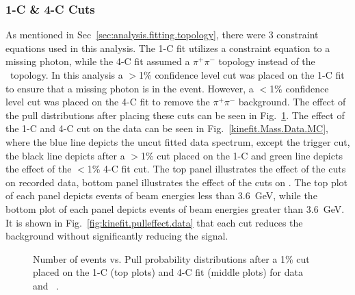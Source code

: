 \subsubsection{1-C \& 4-C Cuts}
As mentioned in Sec~\ref{sec:analysis.fitting.topology}, there were 3 constraint equations used in this analysis. The 1-C fit utilizes a constraint equation to a missing photon, while the 4-C fit assumed a $\pi^+\pi^-$ topology instead of the \epemT \ topology. In this analysis a $>$1\% confidence level cut was placed on the 1-C fit to ensure that a missing photon is in the event. However, a $<$1\% confidence level cut was placed on the 4-C fit to remove the $\pi^+\pi^-$ background. The effect of the pull distributions after placing these cuts can be seen in Fig.~\ref{fig:kinefit.pull.Data.MC}. The effect of the 1-C and 4-C cut on the data can be seen in Fig.~\ref{kinefit.Mass.Data.MC}, where the blue line depicts the uncut fitted data spectrum, except the trigger cut, the black line depicts after a $>$1\% cut placed on the 1-C and green line depicts the effect of the $<$1\% 4-C fit cut. The top panel illustrates the effect of the cuts on recorded data, bottom panel illustrates the effect of the cuts on . The top plot of each panel depicts events of beam energies less than 3.6~GeV, while the bottom plot of each panel depicts events of beam energies greater than 3.6~GeV. It is shown in Fig.~\ref{fig:kinefit.pulleffect.data} that each cut reduces the background without significantly reducing the signal.


\begin{figure}[h!]\begin{center}

\caption[Number of events vs. Pull probablity distributions after a 1\% cut placed on the 1-C (top plots) and 4-C fit (middle plots) for data and ]{\label{fig:kinefit.pull.Data.MC}Number of events vs. Pull probability distributions after a 1\% cut placed on the 1-C (top plots) and 4-C fit (middle plots) for data~ and ~.}

\end{center}\end{figure}


